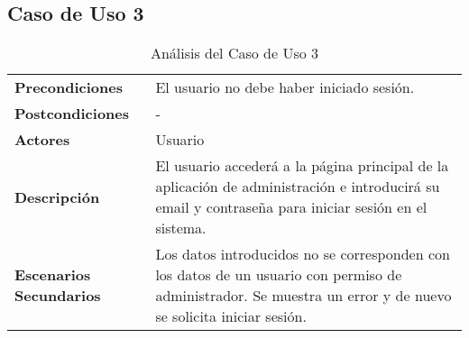 \subsection{Caso de Uso 3}
\begin{table}[H]
  \centering
  \vspace{-5mm}
  \caption{Análisis del Caso de Uso 3}
    \begin{tabular}{p{7.5em}p{24.145em}}
    \toprule
    \rowcolor[rgb]{ .871,  .918,  .965} \multicolumn{2}{p{31.645em}}{\textbf{Iniciar sesión}} \\
    \midrule
    \rowcolor[rgb]{ .906,  .902,  .902} \textbf{Precondiciones} & \cellcolor[rgb]{ 1,  1,  1}El usuario no debe haber iniciado sesión. \\
    \midrule
    \rowcolor[rgb]{ .906,  .902,  .902} \textbf{Postcondiciones} & \cellcolor[rgb]{ 1,  1,  1}- \\
    \midrule
    \rowcolor[rgb]{ .906,  .902,  .902} \textbf{Actores} & \cellcolor[rgb]{ 1,  1,  1}Usuario \\
    \midrule
    \rowcolor[rgb]{ .906,  .902,  .902} \textbf{Descripción} & \cellcolor[rgb]{ 1,  1,  1}El usuario accederá a la página principal de la aplicación de administración e introducirá su email y contraseña para iniciar sesión en el sistema. \\
    \midrule
    \rowcolor[rgb]{ .906,  .902,  .902} \textbf{Escenarios          Secundarios} & \cellcolor[rgb]{ 1,  1,  1} Los datos introducidos no se corresponden con los datos de un usuario con permiso de administrador. Se muestra un error y de nuevo se solicita iniciar sesión. \\
    \bottomrule
    \end{tabular}%
\end{table}%
 
